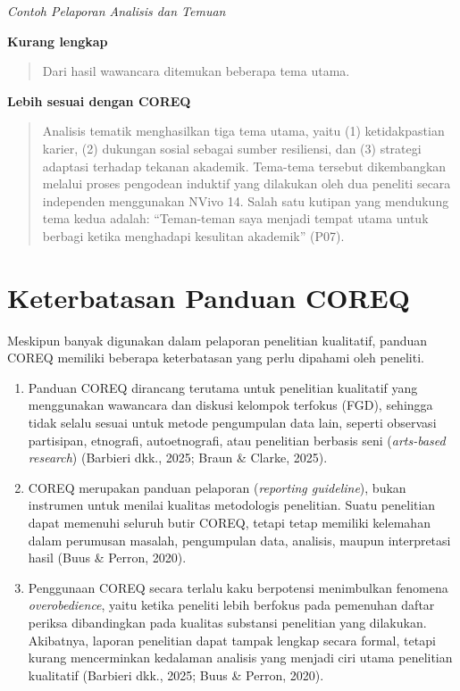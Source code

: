 \documentclass[
  indonesian,
  letterpaper,
  DIV=11,
  numbers=noendperiod]{scrreprt}
\begin{document}
\emph{Contoh Pelaporan Analisis dan Temuan}

\textbf{Kurang lengkap}

\begin{quote}
Dari hasil wawancara ditemukan beberapa tema utama.
\end{quote}

\textbf{Lebih sesuai dengan COREQ}

\begin{quote}
Analisis tematik menghasilkan tiga tema utama, yaitu (1) ketidakpastian
karier, (2) dukungan sosial sebagai sumber resiliensi, dan (3) strategi
adaptasi terhadap tekanan akademik. Tema-tema tersebut dikembangkan
melalui proses pengodean induktif yang dilakukan oleh dua peneliti
secara independen menggunakan NVivo 14. Salah satu kutipan yang
mendukung tema kedua adalah: ``Teman-teman saya menjadi tempat utama
untuk berbagi ketika menghadapi kesulitan akademik'' (P07).
\end{quote}

\section{Keterbatasan Panduan COREQ}\label{keterbatasan-panduan-coreq}

Meskipun banyak digunakan dalam pelaporan penelitian kualitatif, panduan
COREQ memiliki beberapa keterbatasan yang perlu dipahami oleh peneliti.

\begin{enumerate}
\def\labelenumi{\arabic{enumi}.}
\item
  Panduan COREQ dirancang terutama untuk penelitian kualitatif yang
  menggunakan wawancara dan diskusi kelompok terfokus (FGD), sehingga
  tidak selalu sesuai untuk metode pengumpulan data lain, seperti
  observasi partisipan, etnografi, autoetnografi, atau penelitian
  berbasis seni (\emph{arts-based research}) (Barbieri dkk., 2025; Braun
  \& Clarke, 2025).
\item
  COREQ merupakan panduan pelaporan (\emph{reporting guideline}), bukan
  instrumen untuk menilai kualitas metodologis penelitian. Suatu
  penelitian dapat memenuhi seluruh butir COREQ, tetapi tetap memiliki
  kelemahan dalam perumusan masalah, pengumpulan data, analisis, maupun
  interpretasi hasil (Buus \& Perron, 2020).
\item
  Penggunaan COREQ secara terlalu kaku berpotensi menimbulkan fenomena
  \emph{overobedience}, yaitu ketika peneliti lebih berfokus pada
  pemenuhan daftar periksa dibandingkan pada kualitas substansi
  penelitian yang dilakukan. Akibatnya, laporan penelitian dapat tampak
  lengkap secara formal, tetapi kurang mencerminkan kedalaman analisis
  yang menjadi ciri utama penelitian kualitatif (Barbieri dkk., 2025;
  Buus \& Perron, 2020).
\end{enumerate}
\end{document}
